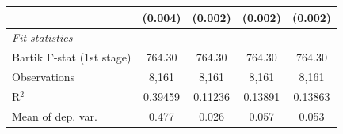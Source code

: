 \begin{tabular}{lcccc}
                                                                         & (0.004)                                 & (0.002)                               & (0.002)                                & (0.002)\\   
   \midrule
   \emph{Fit statistics}\\
   Bartik F-stat (1st stage)                                     & 764.30                                  & 764.30                                & 764.30                                 & 764.30\\  
   Observations                                                          & 8,161                                   & 8,161                                 & 8,161                                  & 8,161\\  
   R$^2$                                                                 & 0.39459                                 & 0.11236                               & 0.13891                                & 0.13863\\  
   Mean of dep. var.                                                     & 0.477                                   & 0.026                                 & 0.057                                  & 0.053\\  
\bottomrule
\end{tabular}
